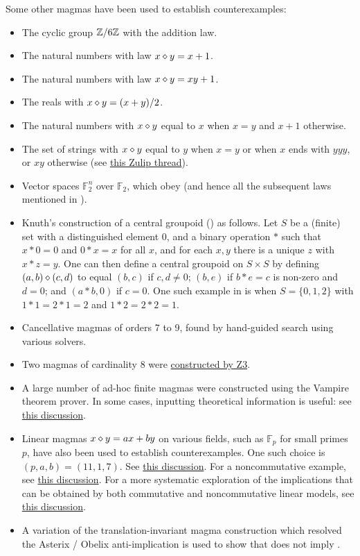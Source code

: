 Some other magmas have been used to establish counterexamples:
\begin{itemize}
  \item The cyclic group $\mathbb{Z}/6\mathbb{Z}$ with the addition law.
  \item The natural numbers with law $x \diamond y = x+1$.
  \item The natural numbers with law $x \diamond y = xy+1$.
  \item The reals with $x \diamond y = (x+y)/2$.
  \item The natural numbers with $x \diamond y$ equal to $x$ when $x=y$ and $x+1$ otherwise.
  \item The set of strings with $x \diamond y$ equal to $y$ when $x=y$ or when $x$ ends with $yyy$, or $xy$ otherwise (see \href{https://leanprover.zulipchat.com/#narrow/stream/458659-Equational/topic/3102.20does.20not.20imply.203176/near/474656031}{this Zulip thread}).
  \item Vector spaces ${\mathbb F}_2^n$ over ${\mathbb F}_2$, which obey  (and hence all the subsequent laws mentioned in ).
  \item Knuth's construction \cite{knuth} of a central groupoid () as follows.  Let $S$ be a (finite) set with a distinguished element $0$, and a binary operation $*$ such that $x*0=0$ and $0*x=x$   for all $x$, and for each $x,y$ there is a unique $z$ with $x*z=y$.  One can then define a central groupoid on $S \times S$ by defining $(a,b) \diamond (c,d)$ to equal $(b,c)$ if $c,d \neq 0$; $(b,e)$ if $b*e=c$ is non-zero and $d=0$; and $(a*b,0)$ if $c=0$.  One such example in \cite{knuth} is when $S = \{0,1,2\}$ with $1*1=2*1=2$ and $1*2=2*2=1$.
  \item Cancellative magmas of orders 7 to 9, found by hand-guided search using various solvers.
  \item Two magmas of cardinality $8$ were \href{https://leanprover.zulipchat.com/#narrow/stream/458659-Equational/topic/using.20z3/near/474918100}{constructed by Z3}.
  \item A large number of ad-hoc finite magmas were constructed using the Vampire theorem prover.  In some cases, inputting theoretical information is useful: see \href{https://leanprover.zulipchat.com/#narrow/channel/458659-Equational/topic/Outstanding.20equations.2C.20v1/near/478066872}{this discussion}.
  \item Linear magmas $x\diamond y = ax+by$ on various fields, such as ${\mathbb F}_p$ for small primes $p$, have also been used to establish counterexamples.  One such choice is $(p,a,b) = (11,1,7)$. See \href{https://leanprover.zulipchat.com/#narrow/stream/458659-Equational/topic/An.20old.20new.20idea}{this discussion}.  For a noncommutative example, see \href{https://leanprover.zulipchat.com/#narrow/channel/458659-Equational/topic/Outstanding.20equations.2C.20v1/near/477928995.2E01}{this discussion}. For a more systematic exploration of the implications that can be obtained by both commutative and noncommutative linear models, see \href{https://leanprover.zulipchat.com/#narrow/channel/458659-Equational/topic/Non-commutative.20linear.20implications}{this discussion}.
  \item A variation of the translation-invariant magma construction which resolved the Asterix / Obelix anti-implication is used to show that  does not imply .
\end{itemize}
